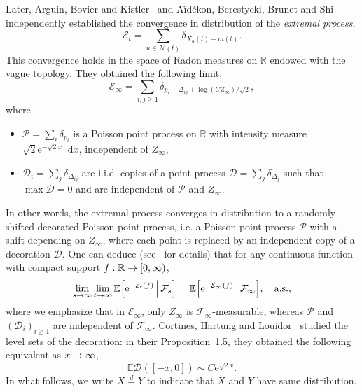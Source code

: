\documentclass[10pt]{amsart}
\theoremstyle{definition}\newtheorem{defi}[theo]{Definition}\newtheorem{rema}[theo]{Remark}\newtheorem{exam}[theo]{Example}\newtheorem{exem}[theo]{Example}\newtheorem{nota}[theo]{Notation}
\newcommand{\e}{\mathrm{e}}
\renewcommand{\d}[1]{\mathop{}\!\mathrm{d}#1}
\newcommand{\E}{\mathbb{E}}
\newcommand{\R}{\mathbb{R}}
\newcommand\1{\mathds{1}}
\newcommand{\cD}{\mathcal{D}}
\newcommand{\cE}{\mathcal{E}}
\newcommand{\cF}{\mathcal{F}}
\newcommand{\cN}{\mathcal{N}}
\newcommand{\cP}{\mathcal{P}}
\let\originalleft\left
\let\originalright\right
\renewcommand{\left}{\mathopen{}\mathclose\bgroup\originalleft}
\renewcommand{\right}{\aftergroup\egroup\originalright}
\renewcommand*{\to}{\mathchoice{\longrightarrow}{\rightarrow}{\rightarrow}{\rightarrow}}
\begin{document}
Later, Arguin, Bovier and Kistler~\cite{ArguinBovierKistler2013} and A\"{i}dékon, Berestycki, Brunet and Shi~\cite{AidekonShi2014} independently established the convergence in distribution of the \emph{extremal process},
\begin{equation*}
\cE_t = \sum_{u \in \cN(t)} \delta_{X_u(t) - m(t)}.
\end{equation*}
This convergence holds in the space of Radon measures on $\R$ endowed with the vague topology. They obtained the following limit,
\begin{equation*}
\cE_\infty = \sum_{i, j \geq 1} \delta_{p_i + \Delta_{ij} + \log(C Z_\infty)/\sqrt{2}},
\end{equation*}
where
\begin{itemize}
\item $\cP = \sum_{i} \delta_{p_i}$ is a Poisson point process on $\R$ with intensity measure $\sqrt{2} \e^{-\sqrt{2}x} \d{x}$, independent of $Z_\infty$,
\item $\cD_i = \sum_j \delta_{\Delta_{ij}}$ are i.i.d. copies of a point process $\cD = \sum_j \delta_{\Delta_{j}}$ such that ${\max \cD = 0}$ and are independent of $\cP$ and $Z_\infty$.
\end{itemize}
In other words, the extremal process converges in distribution to a randomly shifted decorated Poisson point process, i.e. a Poisson point process $\cP$ with a shift depending on $Z_\infty$, where each point is replaced by an independent copy of a decoration $\cD$. One can deduce (see~\cite[Proposition~3.16]{Chataignier2024} for details) that for any continuous function with compact support $f : \R \to [0, \infty)$,
\begin{equation}\label{eq:convergence_extremal_process_conditionally}
\lim_{s \to \infty} \lim_{t \to \infty} \E \left[\e^{-\cE_t(f)}\,\middle|\, \cF_s \right] = \E \left[\e^{-\cE_\infty(f)} \,\middle|\, \cF_\infty \right], \quad \text{a.s.},
\end{equation}
where we emphasize that in $\cE_\infty$, only $Z_\infty$ is $\cF_\infty$-measurable, whereas $\cP$ and $(\cD_i)_{i\geq1}$ are independent of $\cF_\infty$. Cortines, Hartung and Louidor~\cite{CortinesHartungLouidor2019} studied the level sets of the decoration: in their Proposition~1.5, they obtained the following equivalent as $x \to \infty$,
\begin{equation}\label{eq:decoration_estimate}
\E\cD([-x, 0]) \sim C \e^{\sqrt{2} x}.
\end{equation}
In what follows, we write $X \overset{d}{=} Y$ to indicate that $X$ and $Y$ have same distribution.
\end{document}
